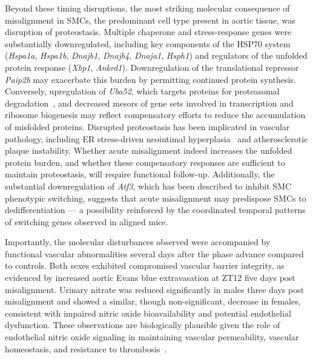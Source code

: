 \documentclass[12pt]{article}
\begin{document}
Beyond these timing disruptions, the most striking molecular consequence of misalignment in SMCs, the predominant cell type present in aortic tissue, was
disruption of proteostasis. Multiple chaperone and stress-response genes were substantially
downregulated, including key components of the HSP70 system (\textit{Hspa1a}, \textit{Hspa1b},
\textit{Dnajb1}, \textit{Dnajb4}, \textit{Dnaja1}, \textit{Hsph1}) and regulators of the unfolded
protein response (\textit{Xbp1}, \textit{Ankrd1}). Downregulation of the translational repressor
\textit{Paip2b} may exacerbate this burden by permitting continued protein synthesis. Conversely,
upregulation of \textit{Uba52}, which targets proteins for proteasomal
degradation~\cite{ref108,ref109}, and decreased mesors of gene sets involved in transcription and
ribosome biogenesis may reflect compensatory efforts to reduce the accumulation of misfolded
proteins. Disrupted proteostasis has been implicated in vascular pathology, including ER
stress-driven neointimal hyperplasia~\cite{ref105} and atherosclerotic plaque instability. Whether
acute misalignment indeed increases the unfolded protein burden, and whether these compensatory
responses are sufficient to maintain proteostasis, will require functional follow-up. Additionally,
the substantial downregulation of \textit{Atf3}, which has been described to inhibit SMC phenotypic
switching, suggests that acute misalignment may predispose SMCs to dedifferentiation --- a
possibility reinforced by the coordinated temporal patterns of switching genes observed in aligned
mice.

Importantly, the molecular disturbances observed were accompanied by functional vascular
abnormalities several days after the phase advance compared to controls. 
Both sexes exhibited compromised vascular barrier integrity, as evidenced by increased aortic Evans blue extravasation at ZT12 five days post misalignment. 
Urinary nitrate was reduced significantly in males three days post misalignment and showed a similar, though non-significant, decrease in females, consistent with impaired nitric oxide bioavailability and potential
endothelial dysfunction.
These observations are biologically plausible given the role of endothelial nitric
oxide signaling in maintaining vascular permeability, vascular homeostasis, and resistance to
thrombosis~\cite{ref136,ref137}. 
\end{document}
